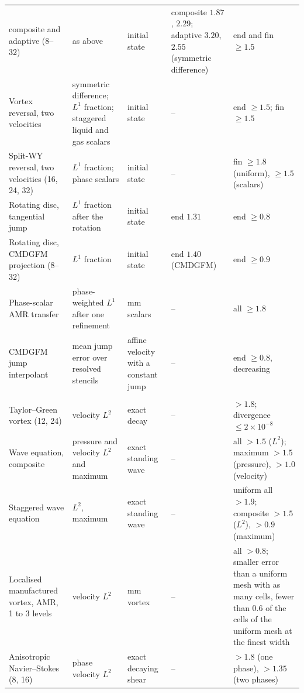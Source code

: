 {\begin{longtable}{@{}>{\raggedright}p{2.35cm}>{\raggedright}p{2.85cm}>{\raggedright}p{1.85cm}>{\raggedright}p{2.45cm}>{\raggedright\arraybackslash}p{2.6cm}@{}}
  \quad composite and adaptive (8--32) & as above & initial state & composite $1.87$, $2.29$; adaptive $3.20$, $2.55$ (symmetric difference) & end and fin $\ge1.5$\\
  Vortex reversal, two velocities & symmetric difference; $L^1$ fraction; staggered liquid and gas scalars & initial state & -- & end $\ge1.5$; fin $\ge1.5$\\
  Split-WY reversal, two velocities (16, 24, 32) & $L^1$ fraction; phase scalars & initial state & -- & fin $\ge1.8$ (uniform), $\ge1.5$ (scalars)\\
  Rotating disc, tangential jump & $L^1$ fraction after the rotation & initial state & end $1.31$ & end $\ge0.8$\\
  Rotating disc, CMDGFM projection (8--32) & $L^1$ fraction & initial state & end $1.40$ (CMDGFM) & end $\ge0.9$\\
  Phase-scalar AMR transfer & phase-weighted $L^1$ after one refinement & mm scalars & -- & all $\ge1.8$\\
  CMDGFM jump interpolant & mean jump error over resolved stencils & affine velocity with a constant jump & -- & end $\ge0.8$, decreasing\\
  \multicolumn{5}{@{}l}{\emph{Flows}}\\
  Taylor--Green vortex (12, 24) & velocity $L^2$ & exact decay & -- & $>1.8$; divergence $\le2\times10^{-8}$\\
  Wave equation, composite & pressure and velocity $L^2$ and maximum & exact standing wave & -- & all $>1.5$ ($L^2$); maximum $>1.5$ (pressure), $>1.0$ (velocity)\\
  Staggered wave equation & $L^2$, maximum & exact standing wave & -- & uniform all $>1.9$; composite $>1.5$ ($L^2$), $>0.9$ (maximum)\\
  Localised manufactured vortex, AMR, 1 to 3 levels & velocity $L^2$ & mm vortex & -- & all $>0.8$; smaller error than a uniform mesh with as many cells, fewer than $0.6$ of the cells of the uniform mesh at the finest width\\
  Anisotropic Navier--Stokes (8, 16) & phase velocity $L^2$ & exact decaying shear & -- & $>1.8$ (one phase), $>1.35$ (two phases)\\
\end{longtable}}

